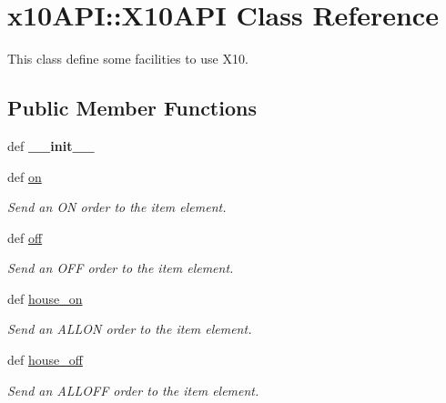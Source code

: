 \hypertarget{classx10API_1_1X10API}{
\section{x10API::X10API Class Reference}
\label{classx10API_1_1X10API}
}
This class define some facilities to use X10.  


\subsection*{Public Member Functions}
\begin{CompactItemize}
\item 
\hypertarget{classx10API_1_1X10API_df1708474fd2eda336c665c64067a648}{
def \textbf{\_\-\_\-init\_\-\_\-}}
\label{classx10API_1_1X10API_df1708474fd2eda336c665c64067a648}

\item 
def \hyperlink{classx10API_1_1X10API_b23095bb54aa45e75857beaa59a7deed}{on}
\begin{CompactList}\small\item\em Send an ON order to the item element. \item\end{CompactList}\item 
def \hyperlink{classx10API_1_1X10API_37be53c20aaa39f5770a5085b80984bc}{off}
\begin{CompactList}\small\item\em Send an OFF order to the item element. \item\end{CompactList}\item 
def \hyperlink{classx10API_1_1X10API_d1e63a9dd573eb16a7d1009c72fac15e}{house\_\-on}
\begin{CompactList}\small\item\em Send an ALLON order to the item element. \item\end{CompactList}\item 
def \hyperlink{classx10API_1_1X10API_b04c7647aa5d80c462f0df36afaff4ec}{house\_\-off}
\begin{CompactList}\small\item\em Send an ALLOFF order to the item element. \item\end{CompactList}\end{CompactItemize}
